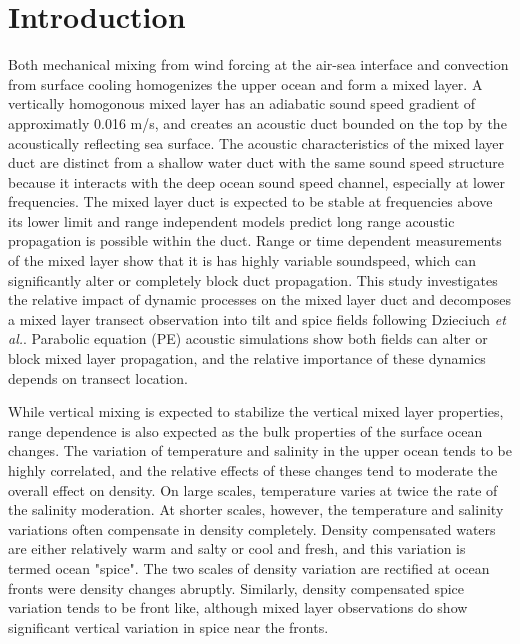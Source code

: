 \documentclass[preprint,NumberedRefs]{JASA}
\begin{document}
\section{\label{sec:intro} Introduction}
Both mechanical mixing from wind forcing at the air-sea interface and convection from surface cooling homogenizes the upper ocean and form a mixed layer\citep{cole2010seasonal}. A vertically homogonous mixed layer has an adiabatic sound speed gradient of approximatly 0.016 m/s, and creates an acoustic duct bounded on the top by the acoustically reflecting sea surface. The acoustic characteristics of the mixed layer duct are distinct from a shallow water duct with the same sound speed structure because it interacts with the deep ocean sound speed channel\citep{porter93}, especially at lower frequencies. The mixed layer duct is expected to be stable at frequencies above its lower limit\citep{Urick1982Prop} and range independent models predict long range acoustic propagation is possible within the duct. Range or time dependent measurements of the mixed layer show that it is has highly variable soundspeed\citep{cole2010seasonal,rudnick1999compensation,klymak2015}, which can significantly alter or completely block duct propagation\citep{colosi2020observations,colosi21}. This study investigates the relative impact of dynamic processes on the mixed layer duct and decomposes a mixed layer transect observation into tilt and spice fields following Dzieciuch \emph{et al.}\citep{dzieciuch2004}. Parabolic equation (PE) acoustic simulations\citep{collins93} show both fields can alter or block mixed layer propagation, and the relative importance of these dynamics depends on transect location.

While vertical mixing is expected to stabilize the vertical mixed layer properties, range dependence is also expected as the bulk properties of the surface ocean changes\citep{ferrari2000}. The variation of temperature and salinity in the upper ocean tends to be highly correlated, and the relative effects of these changes tend to moderate the overall effect on density. On large scales, temperature varies at twice the rate of the salinity moderation. At shorter scales, however, the temperature and salinity variations often compensate in density completely. Density compensated waters are either relatively warm and salty or cool and fresh, and this variation is termed ocean "spice"\citep{munk1981evolution}. The two scales of density variation are rectified at ocean fronts were density changes abruptly. Similarly, density compensated spice variation tends to be front like, although mixed layer observations do show significant vertical variation in spice near the fronts.
\end{document}
